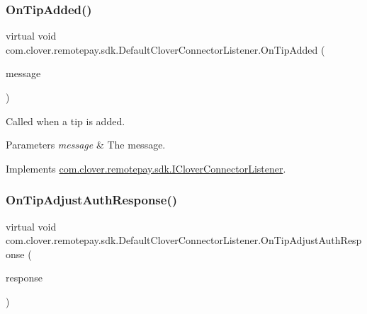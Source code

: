 \subsubsection{\texorpdfstring{On\+Tip\+Added()}{OnTipAdded()}}
{\footnotesize\ttfamily virtual void com.\+clover.\+remotepay.\+sdk.\+Default\+Clover\+Connector\+Listener.\+On\+Tip\+Added (\begin{DoxyParamCaption}\item[{Tip\+Added\+Message}]{message }\end{DoxyParamCaption})\hspace{0.3cm}{\ttfamily [virtual]}}



Called when a tip is added. 


\begin{DoxyParams}{Parameters}
{\em message} & The message.\\
\hline
\end{DoxyParams}


Implements \hyperlink{interfacecom_1_1clover_1_1remotepay_1_1sdk_1_1_i_clover_connector_listener_a39348a8d97a69efbbdf03e3ccbdced7d}{com.\+clover.\+remotepay.\+sdk.\+I\+Clover\+Connector\+Listener}.

\mbox{\label{classcom_1_1clover_1_1remotepay_1_1sdk_1_1_default_clover_connector_listener_ab81030d438c6c75eb2a2b8ee3fd6f51f}} 
\subsubsection{\texorpdfstring{On\+Tip\+Adjust\+Auth\+Response()}{OnTipAdjustAuthResponse()}}
{\footnotesize\ttfamily virtual void com.\+clover.\+remotepay.\+sdk.\+Default\+Clover\+Connector\+Listener.\+On\+Tip\+Adjust\+Auth\+Response (\begin{DoxyParamCaption}\item[{\hyperlink{classcom_1_1clover_1_1remotepay_1_1sdk_1_1_tip_adjust_auth_response}{Tip\+Adjust\+Auth\+Response}}]{response }\end{DoxyParamCaption})\hspace{0.3cm}{\ttfamily [virtual]}}



